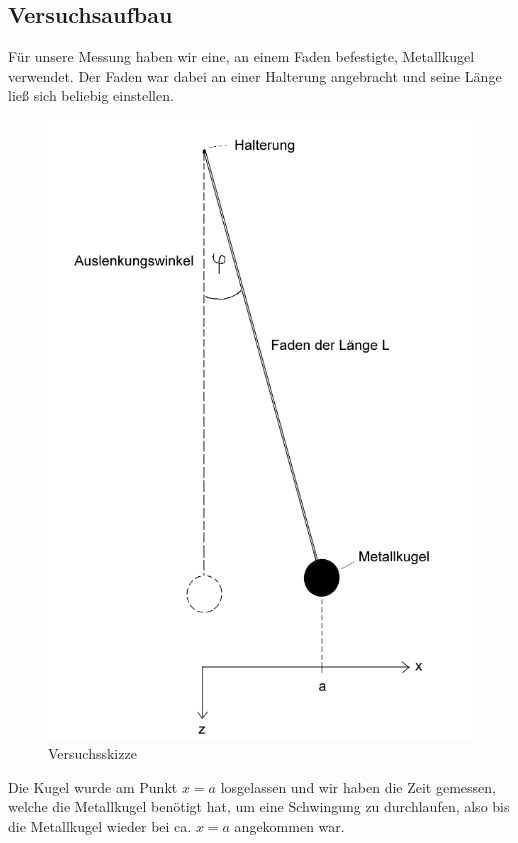 \documentclass[11pt,a4paper,titlepage, ngerman]{article}
\begin{document}
		\subsection{Versuchsaufbau}
		\label{Versuchsaufbau}
			
			Für unsere Messung haben wir eine, an einem Faden befestigte, Metallkugel verwendet. Der Faden war dabei an einer Halterung angebracht und seine Länge ließ sich beliebig einstellen.
			
				\begin{figure}[ht]
					\centering
					\includegraphics[scale=0.4]{Pendel.png}		
					\caption{Versuchsskizze}
					\label{fig:pendel}
				\end{figure}
			
			\newpage
			 Die Kugel wurde am Punkt $x = a$ losgelassen und wir haben die Zeit gemessen, welche die Metallkugel benötigt hat, um eine Schwingung zu durchlaufen, also bis die Metallkugel wieder bei ca. $x = a$ angekommen war. 
			
\end{document}
